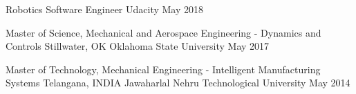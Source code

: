 

\begin{cventries}

  \cveduentry
    {Robotics Software Engineer} %
    {} %
    {Udacity} %
    {May 2018} %

  \cveduentry
    {Master of Science, Mechanical and Aerospace Engineering - Dynamics and Controls} %
    {Stillwater, OK} %
    {Oklahoma State University} %
    {May 2017} %

  \cveduentry
    {Master of Technology, Mechanical Engineering - Intelligent Manufacturing Systems} %
    {Telangana, INDIA} %
    {Jawaharlal Nehru Technological University} %
    {May 2014} %

\end{cventries}
